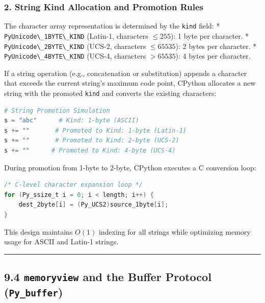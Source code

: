 \hypertarget{string-kind-allocation-and-promotion-rules}{%
\subsubsection{2. String Kind Allocation and Promotion
Rules}\label{string-kind-allocation-and-promotion-rules}}

The character array representation is determined by the
\passthrough{\lstinline!kind!} field: *
\passthrough{\lstinline!PyUnicode\_1BYTE\_KIND!} (Latin-1, characters
\(\le 255\)): 1 byte per character. *
\passthrough{\lstinline!PyUnicode\_2BYTE\_KIND!} (UCS-2, characters
\(\le 65535\)): 2 bytes per character. *
\passthrough{\lstinline!PyUnicode\_4BYTE\_KIND!} (UCS-4, characters
\(> 65535\)): 4 bytes per character.

If a string operation (e.g., concatenation or substitution) appends a
character that exceeds the current string's maximum code point, CPython
allocates a new string with the promoted \passthrough{\lstinline!kind!}
and converts the existing characters:

\begin{lstlisting}[language=Python]
# String Promotion Simulation
s = "abc"      # Kind: 1-byte (ASCII)
s += ""       # Promoted to Kind: 1-byte (Latin-1)
s += ""       # Promoted to Kind: 2-byte (UCS-2)
s += ""      # Promoted to Kind: 4-byte (UCS-4)
\end{lstlisting}

During promotion from 1-byte to 2-byte, CPython executes a C conversion
loop:

\begin{lstlisting}[language=C]
/* C-level character expansion loop */
for (Py_ssize_t i = 0; i < length; i++) {
    dest_2byte[i] = (Py_UCS2)source_1byte[i];
}
\end{lstlisting}

This design maintains \(O(1)\) indexing for all strings while optimizing
memory usage for ASCII and Latin-1 strings.

\begin{center}\rule{0.5\linewidth}{0.5pt}\end{center}

\hypertarget{memoryview-and-the-buffer-protocol-py_buffer}{%
\subsection{\texorpdfstring{9.4 \texttt{memoryview} and the Buffer
Protocol
(\texttt{Py\_buffer})}{9.4 memoryview and the Buffer Protocol (Py\_buffer)}}\label{memoryview-and-the-buffer-protocol-py_buffer}}

